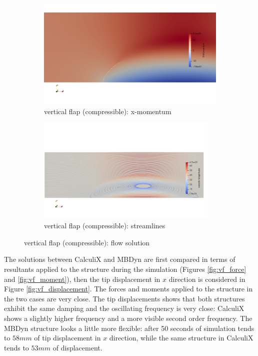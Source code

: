 \begin{figure}[htbp!]
	\centering
	\begin{subfigure}{0.9\textwidth}
	\centering
	\includegraphics[width=\textwidth, trim=0 150 0 150, clip]{images/comp_flap/x-mom.png}
	\caption{vertical flap (compressible): x-momentum}
	\end{subfigure}
	\begin{subfigure}{\textwidth}
	\centering
	\includegraphics[width=0.95\textwidth, trim=0 150 0 150, clip]{images/comp_flap/vel-stream.png}
	\caption{vertical flap (compressible): streamlines}
	\end{subfigure}
	\caption{vertical flap (compressible): flow solution}
	\label{fig:comp_sol}
\end{figure}




The solutions between CalculiX and MBDyn are first compared in terms of resultants applied to the structure during the simulation (Figures \ref{fig:vf_force} and \ref{fig:vf_moment}), then the tip displacement in $x$ direction is considered in Figure \ref{fig:vf_displacement}. The forces and moments applied to the structure in the two cases are very close. 
The tip displacements shows that both structures exhibit the same damping and the oscillating frequency is very close: CalculiX shows a slightly higher frequency and a more visible second order frequency. The MBDyn structure looks a little more flexible: after 50 seconds of simulation tends to $58mm$ of tip displacement in $x$ direction, while the same structure in CalculiX tends to $53mm$ of displacement. 

